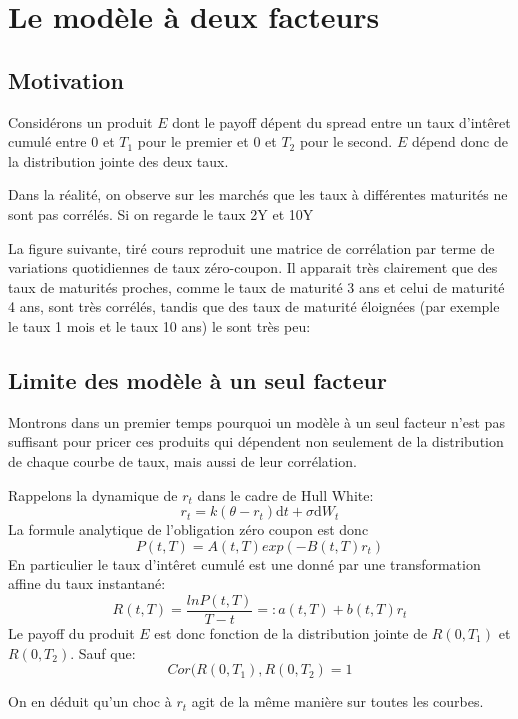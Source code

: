 \section{Le modèle à deux facteurs}
\subsection{Motivation}

Considérons un produit $E$ dont le payoff  dépent  du spread entre un taux d'intêret cumulé entre $0$ et $T_1$ pour le premier et $0$ et $T_2$ pour le second. $E$ dépend donc de la distribution jointe des deux taux.

Dans la réalité, on observe sur les marchés que les taux à différentes maturités ne sont pas corrélés. Si on regarde le taux 2Y et 10Y



La figure suivante, tiré cours \cite{Central} reproduit une matrice de corrélation par terme de variations quotidiennes de taux zéro-coupon. Il apparait très clairement que des taux de maturités proches, comme le taux de maturité 3 ans et celui de maturité 4 ans, sont très corrélés, tandis que des taux de maturité éloignées (par exemple le taux 1 mois et le taux 10 ans) le sont très peu:



\subsection{Limite des modèle à un seul facteur}
Montrons dans un premier temps pourquoi un modèle à un seul facteur n'est pas suffisant pour pricer ces produits qui dépendent non seulement de la distribution de chaque courbe de taux, mais aussi de leur corrélation. 

Rappelons la dynamique de $r_t$ dans le cadre de Hull White:
$$r_t = k(\theta - r_t)  \mathrm{d}t  + \sigma \mathrm{d}W_t$$
La formule analytique de l'obligation zéro coupon est donc
$$P(t, T) = A(t, T) exp(-B(t, T) r_t)$$
En particulier le taux d'intêret cumulé est une donné par une transformation affine du taux instantané:
$$R(t, T) = \frac{ln P(t, T)}{T-t} =: a(t, T) + b(t, T) r_t$$
Le payoff du produit $E$ est donc fonction de la distribution jointe de $R(0, T_1)$ et $R(0, T_2)$. Sauf que:
$$Cor(R(0, T_1), R(0, T_2) = 1$$

On en déduit qu'un choc à $r_t$ agit de la même manière sur toutes les courbes.


